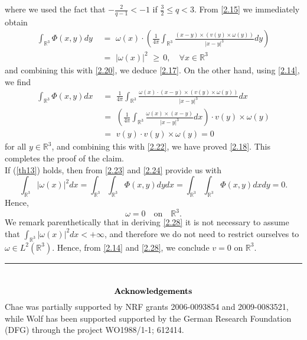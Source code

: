 \documentclass[12pt]{article}
\numberwithin{equation}{section}
\theoremstyle{definition}
\begin{document}
where we used the fact that $-\frac{2}{q-1}<-1$ if $\frac{3}{2}\leq q<3$. From \eqref{2.15} we immediately obtain
\begin{align}\label{2.23}
\int_{\mathbb{R}^3}\Phi(x,y)dy\,\,&=\,\,{\omega}(x)\cdot\left(\frac{1}{4\pi}\int_{\mathbb{R}^3}\frac{(x-y)\times (v(y)\times {\omega}(y))}{|x-y|^3}dy\right)\nonumber\\
&=\,\,|{\omega}(x)|^2\,\,\geq\,0,\quad \forall x\in \mathbb{R}^3
\end{align}
and combining this with \eqref{2.20}, we deduce \eqref{2.17}. On the other hand, using \eqref{2.14}, we find
\begin{align}\label{2.24}
\int_{\mathbb{R}^3}\Phi(x,y)dx\,\,&=\,\,\frac{1}{4\pi}\int_{\mathbb{R}^3}\frac{{\omega}(x)\cdot(x-y)\times (v(y)\times {\omega}(y))}{|x-y|^3}dx\nonumber\\
&=\,\,\left(\frac{1}{4\pi}\int_{\mathbb{R}^3}\frac{{\omega}(x)\times (x-y)}{|x-y|^3}dx\right)\cdot v(y) \times {\omega}(y)\nonumber\\
&=\,\, v(y)\cdot v(y) \times {\omega}(y) = 0
\end{align}
for all $y\in \mathbb{R}^3$, and combining this with \eqref{2.22}, we have proved \eqref{2.18}. This completes the proof of the claim.\\

If (\ref{th13}) holds, then  from \eqref{2.23} and \eqref{2.24}  provide us with
$$\int_{\mathbb{R}^3}|{\omega}(x)|^2dx=\int_{\mathbb{R}^3}\int_{\mathbb{R}^3}\Phi(x,y)dydx=\int_{\mathbb{R}^3}\int_{\mathbb{R}^3}\Phi(x,y)dxdy=0.$$
Hence,
\begin{equation}\label{2.28}
{\omega}=0\quad\text{on}\quad{\mathbb{R}^3}.
\end{equation}
We remark parenthetically that in deriving \eqref{2.28} it is not necessary to assume that $\int_{\mathbb{R}^3}|{\omega}(x)|^2 dx <+\infty$,
and therefore we do not need to restrict ourselves to ${\omega}\in L^2(\mathbb{R}^3)$. Hence, from \eqref{2.14} and \eqref{2.28}, we conclude
$v=0$ on $\mathbb{R}^3$.  \hfill {\rule{0.2cm}{0.2cm}} \\

\hspace{0.5cm}
$$\mbox{\bf Acknowledgements}$$
Chae was partially supported by NRF grants 2006-0093854 and  2009-0083521, while Wolf has been supported 
supported by the German Research Foundation (DFG) through the project WO1988/1-1; 612414.  
\end{document}
